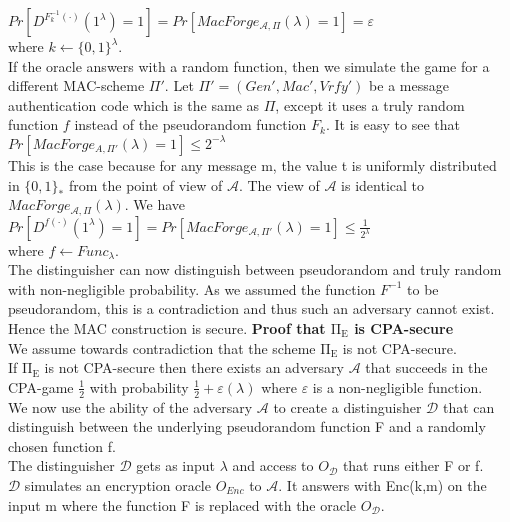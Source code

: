 $Pr\left [ D^{F_{k}^{-1}(\cdot )}(1^{\lambda }) = 1 \right ] = Pr\left [ MacForge_{\mathcal{A},\Pi}(\lambda ) = 1 \right ] = \varepsilon $\\
where $k \leftarrow  \{0,1\}^{\lambda }$.\\
If the oracle answers with a random function, then we simulate the game for a different MAC-scheme $\Pi'$.
Let $\Pi' = (Gen', Mac', Vrfy')$ be a message authentication code which is the same as $\Pi$, except it uses a truly random function $f$ instead of the pseudorandom function $F_{k}$. 
It is easy to see that \\
$Pr\left [ MacForge_{A,\Pi'}(\lambda ) = 1 \right ] \leq 2^{-\lambda } $\\
This is the case because for any message m, the value t is uniformly distributed in $\{0,1\}_{*}$ from the point of view of $\mathcal{A}$. The view of $\mathcal{A}$ is identical to $MacForge_{\mathcal{A},\Pi}(\lambda )$. We have \\
$Pr\left [ D^{f(\cdot )}(1^{\lambda }) = 1 \right ] = Pr\left [ MacForge_{\mathcal{A},\Pi'}(\lambda ) = 1 \right ]  \leq \frac{1}{2^{\lambda }} $ \\
where $f \leftarrow Func_{\lambda }$.\\
The distinguisher can now distinguish between pseudorandom and truly random with non-negligible probability.
As we assumed the function $F^{-1}$ to be pseudorandom, this is a contradiction and thus such an adversary cannot exist. Hence the MAC construction is secure.
\vskip 1cm
\pagebreak
\noindent\textbf{Proof that $\mathrm{\Pi_{E}}$ is CPA-secure}\\
We assume towards contradiction that the scheme $\mathrm{\Pi_{E}}$ is not CPA-secure.\\
If $\mathrm{\Pi_{E}}$ is not CPA-secure then there exists an adversary $\mathcal{A}$ that succeeds in the CPA-game $\frac{1}{2}$ with probability $\frac{1}{2} + \varepsilon(\lambda )$ where $\varepsilon$ is a non-negligible function.\\
We now use the ability of the adversary $\mathcal{A}$ to create a distinguisher $\mathcal{D}$ that can distinguish between the underlying pseudorandom function F and a randomly chosen function f.\\
The distinguisher $\mathcal{D}$ gets as input $\lambda $ and access to $O_{\mathcal{D}}$ that runs either F or f.\\
$\mathcal{D}$ simulates an encryption oracle $O_{Enc}$ to $\mathcal{A}$. It answers with Enc(k,m) on the input m where the function F is replaced with the oracle $O_{\mathcal{D}}$.\\
